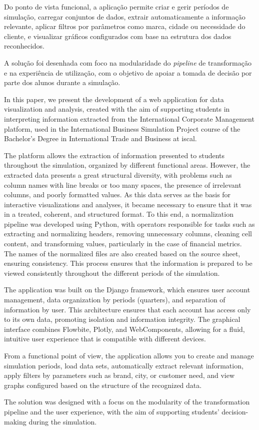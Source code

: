 Do ponto de vista funcional, a aplicação permite criar e gerir períodos de simulação, carregar conjuntos de dados, extrair automaticamente a informação relevante, aplicar filtros por parâmetros como marca, cidade ou necessidade do cliente, e visualizar gráficos configurados com base na estrutura dos dados reconhecidos.

A solução foi desenhada com foco na modularidade do \textit{pipeline} de transformação e na experiência de utilização, com o objetivo de apoiar a tomada de decisão por parte dos alunos durante a simulação.


In this paper, we present the development of a web application for data visualization and analysis, created with the aim of supporting students in interpreting information extracted from the International Corporate Management platform, used in the International Business Simulation Project course of the Bachelor's Degree in International Trade and Business at \gls{iscal}.

The platform allows the extraction of information presented to students throughout the simulation, organized by different functional areas. However, the extracted data presents a great structural diversity, with problems such as column names with line breaks or too many spaces, the presence of irrelevant columns, and poorly formatted values. As this data serves as the basis for interactive visualizations and analyses, it became necessary to ensure that it was in a treated, coherent, and structured format. To this end, a normalization pipeline was developed using Python, with operators responsible for tasks such as extracting and normalizing headers, removing unnecessary columns, cleaning cell content, and transforming values, particularly in the case of financial metrics. The names of the normalized files are also created based on the source sheet, ensuring consistency. This process ensures that the information is prepared to be viewed consistently throughout the different periods of the simulation.

The application was built on the Django framework, which ensures user account management, data organization by periods (quarters), and separation of information by user. This architecture ensures that each account has access only to its own data, promoting isolation and information integrity. The graphical interface combines Flowbite, Plotly, and WebComponents, allowing for a fluid, intuitive user experience that is compatible with different devices.

From a functional point of view, the application allows you to create and manage simulation periods, load data sets, automatically extract relevant information, apply filters by parameters such as brand, city, or customer need, and view graphs configured based on the structure of the recognized data.

The solution was designed with a focus on the modularity of the transformation pipeline and the user experience, with the aim of supporting students' decision-making during the simulation.
